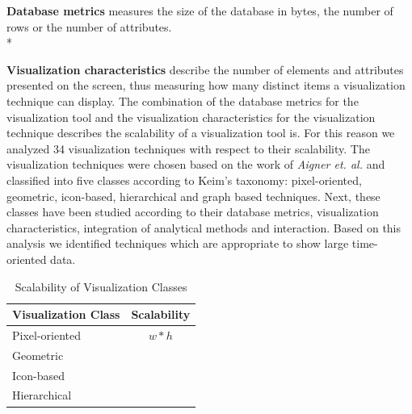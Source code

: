 \textbf{Database metrics} measures the size of the database in bytes, the number of rows or the number of attributes. \\*

\textbf{Visualization characteristics} describe the number of elements and attributes presented on the screen, thus measuring how many distinct items a visualization technique can display.
The combination of the database metrics for the visualization tool and the visualization characteristics for the visualization technique describes the scalability of a visualization tool is. For this reason we analyzed 34 visualization techniques with respect to their scalability. The visualization techniques were chosen based on the work of \textit{Aigner et. al.}\cite{Aigner2011} and classified into five classes according to Keim's taxonomy\cite{Keim2002}: pixel-oriented, geometric, icon-based, hierarchical and graph based techniques. Next, these classes have been studied according to their database metrics, visualization characteristics, integration of analytical methods and interaction. Based on this analysis we identified  techniques which are appropriate to show large time-oriented data. 

\begin{table}[th]
	\centering
	\caption{Scalability of Visualization Classes}
	\label{vizScalability}
	\begin{tabu}{ l | c }
	\toprule
	Visualization Class & Scalability\\
	\midrule
	Pixel-oriented &  $w*h$ \\
	Geometric &  \\
	Icon-based &  \\
	Hierarchical &   \\
	\bottomrule
	\end{tabu}
\end{table}

